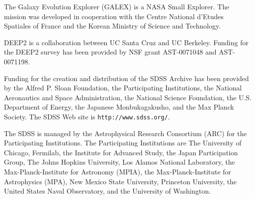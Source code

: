 \documentclass[10pt,preprint]{aastex}
\begin{document}
The Galaxy Evolution Explorer (GALEX) is a NASA Small Explorer. The
mission was developed in cooperation with the Centre National d'Etudes
Spatiales of France and the Korean Ministry of Science and Technology.

DEEP2 is a collaboration between UC Santa Cruz and UC Berkeley.
Funding for the DEEP2 survey has been provided by NSF grant
AST-0071048 and AST-0071198.

Funding for the creation and distribution of the SDSS Archive has been
provided by the Alfred P. Sloan Foundation, the Participating
Institutions, the National Aeronautics and Space Administration, the
National Science Foundation, the U.S. Department of Energy, the
Japanese Monbukagakusho, and the Max Planck Society. The SDSS Web site
is {\tt http://www.sdss.org/}.

The SDSS is managed by the Astrophysical Research Consortium (ARC) for
the Participating Institutions. The Participating Institutions are The
University of Chicago, Fermilab, the Institute for Advanced Study, the
Japan Participation Group, The Johns Hopkins University, Los Alamos
National Laboratory, the Max-Planck-Institute for Astronomy (MPIA),
the Max-Planck-Institute for Astrophysics (MPA), New Mexico State
University, Princeton University, the United States Naval Observatory,
and the University of Washington.
 
\end{document}
